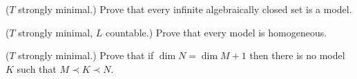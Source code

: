 \begin{exercise}\label{ex_infinite_acl}
($T$ strongly minimal.) Prove that every infinite algebraically closed set is a model.\QED
\end{exercise}

\begin{exercise}
($T$ strongly minimal, $L$ countable.) Prove that every model is homogeneous.\QED 
\end{exercise}

\begin{exercise}
($T$ strongly minimal.) Prove that if $\dim N=\dim M+1$ then there is no model $K$ such that $M\prec K\prec N$.\QED 
\end{exercise}




% 

